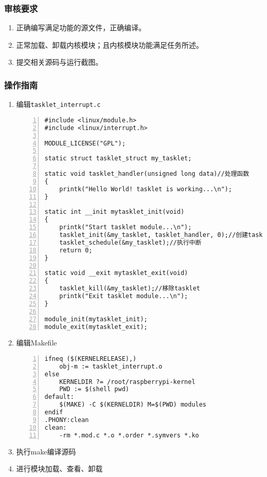 \documentclass{article}
\begin{document}
\subsubsection{审核要求}
\begin{enumerate}
	\item 正确编写满足功能的源文件，正确编译。
	\item 正常加载、卸载内核模块；且内核模块功能满足任务所述。
	\item 提交相关源码与运行截图。
\end{enumerate}

\subsubsection{操作指南}
\begin{enumerate}

	\item 编辑\verb|tasklet_interrupt.c|
	      \begin{lstlisting}[numbers=left]
#include <linux/module.h>
#include <linux/interrupt.h>

MODULE_LICENSE("GPL");

static struct tasklet_struct my_tasklet;

static void tasklet_handler(unsigned long data)//处理函数
{
	printk("Hello World! tasklet is working...\n");
}

static int __init mytasklet_init(void)
{
	printk("Start tasklet module...\n");
	tasklet_init(&my_tasklet, tasklet_handler, 0);//创建tasklet
	tasklet_schedule(&my_tasklet);//执行中断
	return 0;
}

static void __exit mytasklet_exit(void)
{
	tasklet_kill(&my_tasklet);//移除tasklet
	printk("Exit tasklet module...\n");
}

module_init(mytasklet_init);
module_exit(mytasklet_exit);

\end{lstlisting}
	\item 编辑Makefile
	      \begin{lstlisting}[numbers=left]
ifneq ($(KERNELRELEASE),)
	obj-m := tasklet_interrupt.o
else
	KERNELDIR ?= /root/raspberrypi-kernel
	PWD := $(shell pwd)
default:
	$(MAKE) -C $(KERNELDIR) M=$(PWD) modules
endif
.PHONY:clean
clean:
	-rm *.mod.c *.o *.order *.symvers *.ko
\end{lstlisting}
	\item 执行make编译源码
	\item 进行模块加载、查看、卸载
\end{enumerate}
\end{document}
